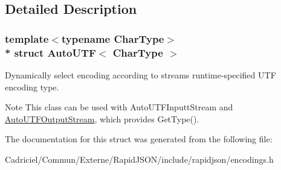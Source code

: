 \subsection{Detailed Description}
\subsubsection*{template$<$typename Char\+Type$>$\\*
struct Auto\+U\+T\+F$<$ Char\+Type $>$}

Dynamically select encoding according to stream\textquotesingle{}s runtime-\/specified U\+TF encoding type. 

\begin{DoxyNote}{Note}
This class can be used with Auto\+U\+T\+F\+Inputt\+Stream and \hyperlink{class_auto_u_t_f_output_stream}{Auto\+U\+T\+F\+Output\+Stream}, which provides Get\+Type(). 
\end{DoxyNote}


The documentation for this struct was generated from the following file\+:\begin{DoxyCompactItemize}
\item 
Cadriciel/\+Commun/\+Externe/\+Rapid\+J\+S\+O\+N/include/rapidjson/encodings.\+h\end{DoxyCompactItemize}
